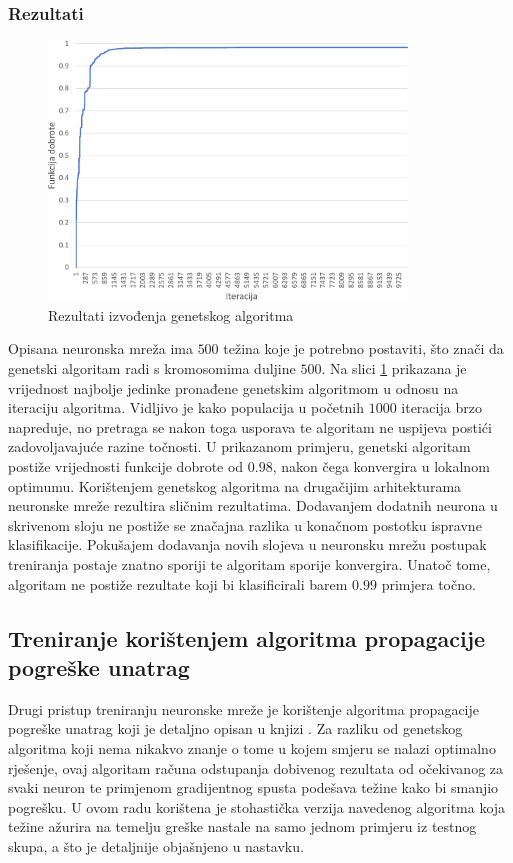 \documentclass[times, utf8, zavrsni, numeric]{fer}
\begin{document}
\subsubsection{Rezultati}
\begin{figure}[ht!]
    \centering
    \includegraphics[width=0.85\textwidth]{Images/Ga.pdf}
    \captionsetup{justification=centering}
    \caption{Rezultati izvođenja genetskog algoritma}
    \label{fig:ga}
\end{figure}

Opisana neuronska mreža ima $500$ težina koje je potrebno postaviti, što znači da genetski algoritam radi s kromosomima duljine $500$. 
Na slici \ref{fig:ga} prikazana je vrijednost najbolje jedinke pronađene genetskim algoritmom u odnosu na iteraciju algoritma.
Vidljivo je kako populacija u početnih $1000$ iteracija brzo napreduje, no pretraga se nakon toga usporava te algoritam ne uspijeva postići zadovoljavajuće razine točnosti.
U prikazanom primjeru, genetski algoritam postiže vrijednosti funkcije dobrote od $0.98$, nakon čega konvergira u lokalnom optimumu.
Korištenjem genetskog algoritma na drugačijim arhitekturama neuronske mreže rezultira sličnim rezultatima.
Dodavanjem dodatnih neurona u skrivenom sloju ne postiže se značajna razlika u konačnom postotku ispravne klasifikacije.
Pokušajem dodavanja novih slojeva u neuronsku mrežu postupak treniranja postaje znatno sporiji te algoritam sporije konvergira.
Unatoč tome, algoritam ne postiže rezultate koji bi klasificirali barem $0.99$ primjera točno.

\subsection{Treniranje korištenjem algoritma propagacije pogreške unatrag}
Drugi pristup treniranju neuronske mreže je korištenje algoritma propagacije pogreške unatrag koji je detaljno opisan u knjizi \cite{neuroracunarstvo}.
Za razliku od genetskog algoritma koji nema nikakvo znanje o tome u kojem smjeru se nalazi optimalno rješenje, ovaj algoritam računa odstupanja dobivenog rezultata od očekivanog za svaki neuron te primjenom gradijentnog spusta podešava težine kako bi smanjio pogrešku.
U ovom radu korištena je stohastička verzija navedenog algoritma koja težine ažurira na temelju greške nastale na samo jednom primjeru iz testnog skupa, a što je detaljnije objašnjeno u nastavku.
\end{document}
